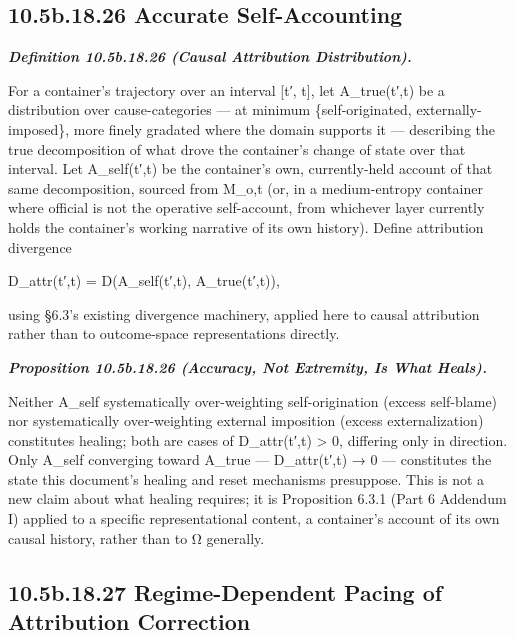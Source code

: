 \documentclass[
]{article}
\begin{document}
\hypertarget{b.18.26-accurate-self-accounting}{%
\subsection{10.5b.18.26 Accurate
Self-Accounting}\label{b.18.26-accurate-self-accounting}}

\emph{\textbf{Definition 10.5b.18.26 (Causal Attribution
Distribution).}}

For a container's trajectory over an interval {[}t′, t{]}, let
A\_true(t′,t) be a distribution over cause-categories --- at minimum
\{self-originated, externally-imposed\}, more finely gradated where the
domain supports it --- describing the true decomposition of what drove
the container's change of state over that interval. Let A\_self(t′,t) be
the container's own, currently-held account of that same decomposition,
sourced from M\_o,t (or, in a medium-entropy container where official is
not the operative self-account, from whichever layer currently holds the
container's working narrative of its own history). Define attribution
divergence

D\_attr(t′,t) = D(A\_self(t′,t), A\_true(t′,t)),

using §6.3's existing divergence machinery, applied here to causal
attribution rather than to outcome-space representations directly.

\emph{\textbf{Proposition 10.5b.18.26 (Accuracy, Not Extremity, Is What
Heals).}}

Neither A\_self systematically over-weighting self-origination (excess
self-blame) nor systematically over-weighting external imposition
(excess externalization) constitutes healing; both are cases of
D\_attr(t′,t) \textgreater{} 0, differing only in direction. Only
A\_self converging toward A\_true --- D\_attr(t′,t) → 0 --- constitutes
the state this document's healing and reset mechanisms presuppose. This
is not a new claim about what healing requires; it is Proposition 6.3.1
(Part 6 Addendum I) applied to a specific representational content, a
container's account of its own causal history, rather than to Ω
generally.

\hypertarget{b.18.27-regime-dependent-pacing-of-attribution-correction}{%
\subsection{10.5b.18.27 Regime-Dependent Pacing of Attribution
Correction}\label{b.18.27-regime-dependent-pacing-of-attribution-correction}}
\end{document}
